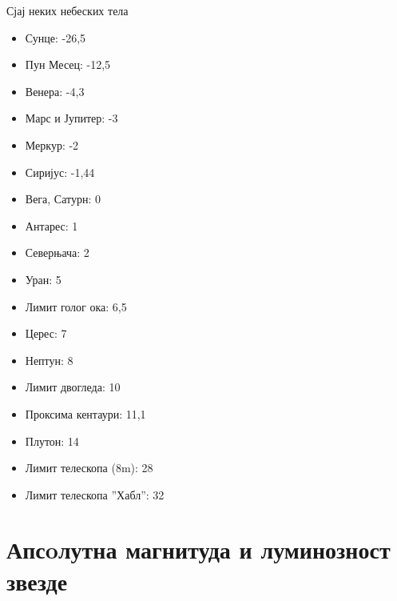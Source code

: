 \documentclass[aspectratio=169, xcolor=table, 10pt]{beamer}
\begin{document}
\begin{frame}{Сјај неких небеских тела}
  \begin{multicols}{2}
    \begin{itemize}
      \item Сунце: -26,5
      \item Пун Месец: -12,5
      \item Венера: -4,3
      \item Марс и Јупитер: -3
      \item Меркур: -2
      \item Сиријус: -1,44
      \item Вега, Сатурн: 0
      \item Антарес: 1
      \item Северњача: 2
      \item Уран: 5
      \item Лимит голог ока: 6,5
      \item Церес: 7
      \item Нептун: 8
      \item Лимит двогледа: 10
      \item Проксима кентаури: 11,1
      \item Плутон: 14
      \item Лимит телескопа (8m): 28
      \item Лимит телескопа ”Хабл”: 32
    \end{itemize}
  \end{multicols}
\end{frame}

\section{Апсoлутна магнитуда и луминозност звезде}
\end{document}
